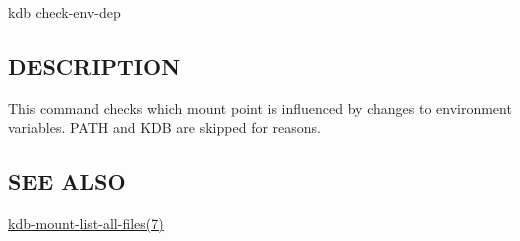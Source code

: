 {\ttfamily kdb check-\/env-\/dep}

\subsection*{D\+E\+S\+C\+R\+I\+P\+T\+I\+ON}

This command checks which mount point is influenced by changes to environment variables. {\ttfamily P\+A\+TH} and {\ttfamily K\+DB} are skipped for reasons.

\subsection*{S\+EE A\+L\+SO}


\begin{DoxyItemize}
\item \hyperlink{md_doc_help_kdb-mount-list-all-files_doc_help_kdb-mount-list-all-files_md}{kdb-\/mount-\/list-\/all-\/files(7)} 
\end{DoxyItemize}